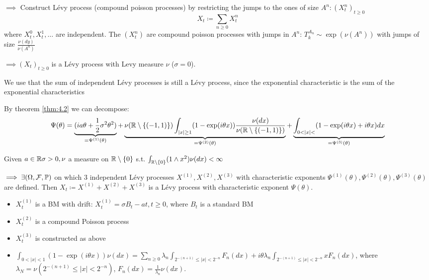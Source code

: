 $\implies$ Construct Lévy process (compound poisson processes) by restricting the jumps to the ones of size $A^n:(X_t^n)_{t\geq 0}$
\[X_t\coloneqq \sum_{n\geq 0} X_t^n\]
where $X_t^0,X_t^1,\dots$ are independent. The $(X_t^n)$ are compound poisson processes with jumps in $A^n$: $T_k^{A_n}\sim\exp(\nu(A^n))$ with jumps of size $\frac{\nu(dy)}{\nu(A^n)}$

$\implies (X_t)_{t\geq 0}$ is a Lévy process with Levy measure $\nu$ ($\sigma=0$).

\begin{aremark}
    We use that the sum of independent Lévy processes is still a Lévy process, since the exponential characteristic is the sum of the exponential characteristics
\end{aremark}

By theorem \ref{thm:4.2} we can decompose:
\[\Psi(\theta)=\underbrace{(ia\theta+\frac{1}{2}\sigma^2\theta^2)}_{=\Psi^{(1)}(\theta)}+\underbrace{\nu(\R\setminus\{(-1,1)\})\int_{|x|\geq 1}(1-\exp(i\theta x))\frac{\nu(dx)}{\nu(\R\setminus\{(-1,1)\})}}_{=\Psi^{(2)}(\theta)}+\underbrace{\int_{0<|x|<} (1-\exp(i\theta x)+i\theta x)dx}_{=\Psi^{(3)}(\theta)}\]

\begin{theorem}\label{thm:4.7}
Given $a\in\mathbb{R}\sigma>0,\nu$ a measure on $\mathbb{R}\setminus\{0\}$ s.t. $\int_{\mathbb{R}\setminus\{0\}}(1\land x^2)\nu(dx)<\infty$

$\implies \exists(\Omega,\mathcal{F},\mathbb{P})$ on which 3 independent Lévy processes $X^{(1)},X^{(2)},X^{(3)}$
with characteristic exponents $\Psi^{(1)}(\theta),\Psi^{(2)}(\theta),\Psi^{(3)}(\theta)$ are defined.
Then $X_t\coloneqq X^{(1)}+X^{(2)}+X^{(3)}$ is a Lévy process with characteristic exponent $\Psi(\theta).$

\begin{itemize}
    \item $X_t^{(1)}$ is a BM with drift: $X_t^{(1)}=\sigma B_t-at,t\geq 0$, where $B_t$ is a standard BM 
    \item $X_t^{(2)}$ is a compound Poisson process 
    \item $X_t^{(3)}$ is constructed as above
    \item $\int_{0<|x|<1} (1-\exp(i\theta x))\nu(dx)=\sum_{n\geq 0}\lambda_n\int_{2^{-(n+1)}\leq |x|<2^{-n}} F_n(dx)+i\theta\lambda_n\int_{2^{-(n+1)}\leq |x|<2^{-n}} x F_n(dx)$, where 
        $\lambda_N=\nu(2^{-(n+1)}\leq |x|<2^{-n})$, $F_n(dx)=\frac{1}{\lambda_n}\nu(dx)$.
\end{itemize}

\end{theorem}


